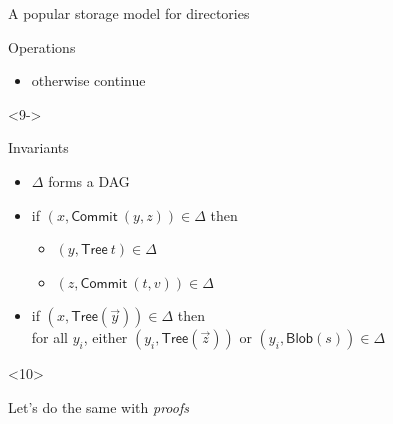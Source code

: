 \documentclass[ignorenonframetext,red]{beamer}
\begin{document}
\begin{frame}{A popular storage model for directories}
\begin{onlyenv}
\begin{overlayarea}{\textwidth}{12em}
\begin{onlyenv}
\begin{block}{Operations}
\begin{description}
\begin{itemize}
            \item otherwise continue
            \end{itemize}
          \item[\dots]
          \end{description}
        \end{block}
      \end{onlyenv}
      \begin{onlyenv}<9->
        \begin{block}{Invariants}
          \begin{itemize}
          \item $\Delta$ forms a DAG
          \item if $(x, \mathsf{Commit}\ (y,z)) \in\Delta$ then
            \begin{itemize}
            \item $(y, \mathsf{Tree}\ t)\in\Delta$
            \item $(z, \mathsf{Commit}\ (t,v))\in\Delta$
            \end{itemize}
          \item if $(x, \mathsf{Tree}(\vec y))\in\Delta$ then \\
            for all $y_i$, either $(y_i, \mathsf{Tree}(\vec z))$ or
            $(y_i, \mathsf{Blob}(s))\in\Delta$
          \end{itemize}
        \end{block}
    \begin{onlyenv}<10>
      \begin{center}
        {\Large Let's do the same with \emph{proofs}}
      \end{center}
    \end{onlyenv}
      \end{onlyenv}
    \end{overlayarea}
  \end{onlyenv}
\end{frame}
\end{document}
